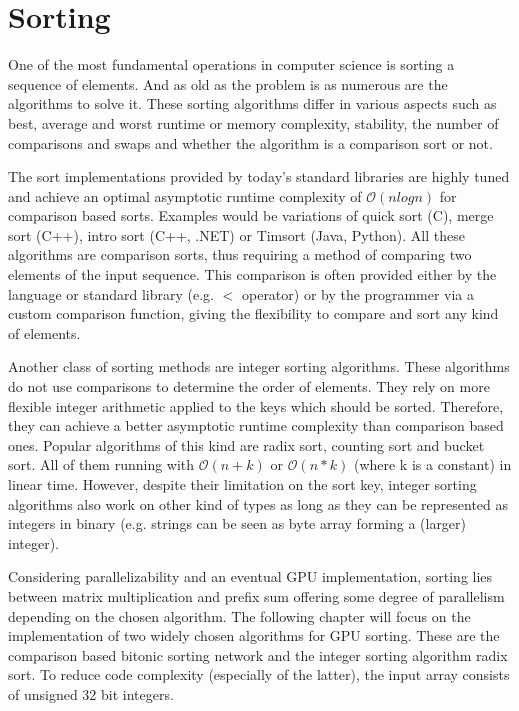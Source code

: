 \section{Sorting}
\label{sec:sorting}

One of the most fundamental operations in computer science is sorting a sequence of elements. And as old as the problem is as numerous are the algorithms to solve it. These sorting algorithms differ in various aspects such as best, average and worst runtime or memory complexity, stability, the number of comparisons and swaps and whether the algorithm is a comparison sort or not.

The sort implementations provided by today's standard libraries are highly tuned and achieve an optimal asymptotic runtime complexity of $\mathcal{O}(n log n)$ for comparison based sorts. Examples would be variations of quick sort (C), merge sort (C++), intro sort (C++, .NET) or Timsort (Java, Python). All these algorithms are comparison sorts, thus requiring a method of comparing two elements of the input sequence. This comparison is often provided either by the language or standard library (e.g. $<$ operator) or by the programmer via a custom comparison function, giving the flexibility to compare and sort any kind of elements.

Another class of sorting methods are integer sorting algorithms. These algorithms do not use comparisons to determine the order of elements. They rely on more flexible integer arithmetic applied to the keys which should be sorted. Therefore, they can achieve a better asymptotic runtime complexity than comparison based ones. Popular algorithms of this kind are radix sort, counting sort and bucket sort. All of them running with $\mathcal{O}(n + k)$ or $\mathcal{O}(n * k)$ (where k is a constant) in linear time.
However, despite their limitation on the sort key, integer sorting algorithms also work on other kind of types as long as they can be represented as integers in binary (e.g. strings can be seen as byte array forming a (larger) integer).

Considering parallelizability and an eventual GPU implementation, sorting lies between matrix multiplication and prefix sum offering some degree of parallelism depending on the chosen algorithm. The following chapter will focus on the implementation of two widely chosen algorithms for GPU sorting. These are the comparison based bitonic sorting network and the integer sorting algorithm radix sort. To reduce code complexity (especially of the latter), the input array consists of unsigned 32 bit integers.



